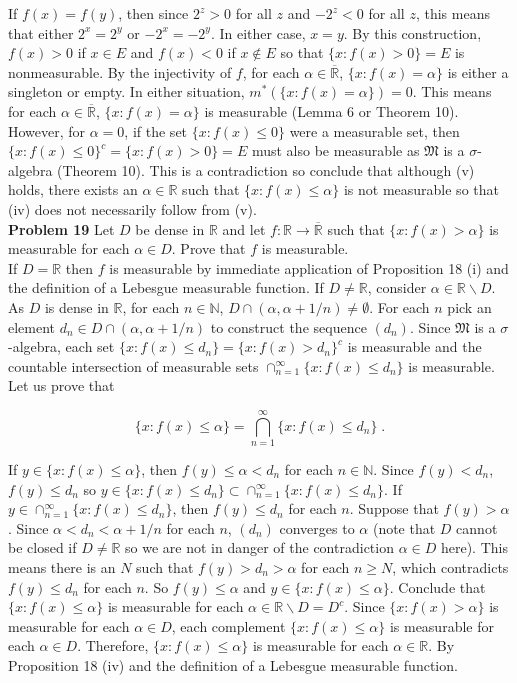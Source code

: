 \documentclass[a4paper]{article}
\begin{document}
If $f(x) = f(y)$, then since $2^z > 0$ for all $z$ and $-2^z < 0$ for all $z$, this means that either $2^x = 2^y$ or $-2^x = -2^y$. In either case, $x = y$. By this construction, $f(x) > 0$ if $x \in E$ and $f(x) < 0$ if $x \not\in E$ so that $\{x : f(x) > 0 \} = E$ is nonmeasurable. By the injectivity of $f$, for each $\alpha \in \overline{\mathbb{R}}$, $\{x : f(x) = \alpha\}$ is either a singleton or empty. In either situation, $m^*(\{x : f(x) = \alpha \}) = 0$. This means for each $\alpha \in \overline{\mathbb{R}}$, $\{x : f(x) = \alpha \}$ is measurable (Lemma 6 or Theorem 10). However, for $\alpha = 0$, if the set $\{x : f(x) \leq 0\}$ were a measurable set, then $\{x : f(x) \leq 0\}^c = \{x : f(x) > 0\} =E$ must also be measurable as $\mathfrak{M}$ is a $\sigma$-algebra (Theorem 10). This is a contradiction so conclude that although (v) holds, there exists an $\alpha \in \mathbb{R}$ such that $\{x : f(x) \leq \alpha\}$ is not measurable so that (iv) does not necessarily follow from (v). \\

{\bf Problem 19} Let $D$ be dense in $\mathbb{R}$ and let $f: \mathbb{R} \rightarrow \overline{\mathbb{R}}$  such that $\{x : f(x) > \alpha\}$ is measurable for each $\alpha \in D$. Prove that $f$ is measurable. \\

If $D = \mathbb{R}$ then $f$ is measurable by immediate application of Proposition 18 (i) and the definition of a Lebesgue measurable function. If $D \neq \mathbb{R}$,  consider $\alpha \in \mathbb{R} \backslash D$. As $D$ is dense in $\mathbb{R}$, for each $n \in \mathbb{N}$, $D \cap (\alpha, \alpha + 1/n) \neq \emptyset$. For each $n$ pick an element $d_n \in D\cap (\alpha, \alpha + 1/n)$ to construct the sequence $(d_n)$. Since $\mathfrak{M}$ is a $\sigma$-algebra, each set $\{x : f(x) \leq d_n\} = \{x : f(x) > d_n\}^c$ is measurable and  the countable intersection of measurable sets $\cap_{n=1}^\infty \{x : f(x) \leq d_n \}$ is measurable. Let us prove that

$$\{x : f(x) \leq \alpha\} = \bigcap_{n=1}^\infty \{x : f(x) \leq d_n \} \;.$$

If $y \in \{x : f(x) \leq \alpha\}$, then $f(y) \leq \alpha< d_n$ for each $n \in \mathbb{N}$. Since $f(y) < d_n$, $f(y) \leq d_n$ so $y \in \{x : f(x) \leq  d_n\}\subset \cap_{n=1}^\infty \{x : f(x) \leq d_n\}$. If $y \in \cap_{n=1}^\infty \{x : f(x) \leq d_n\}$, then $f(y) \leq d_n$ for each $n$. Suppose that $f(y) > \alpha$. Since $\alpha < d_n < \alpha + 1/n$ for each $n$, $(d_n)$ converges to $\alpha$ (note that $D$ cannot be closed if $D \neq \mathbb{R}$ so we are not in danger of the contradiction $\alpha \in D$ here). This means there is an $N$ such that  $f(y) > d_n > \alpha$ for each $n \geq N$, which contradicts $f(y) \leq d_n$ for each $n$. So $f(y) \leq \alpha$ and $y \in \{x: f(x) \leq \alpha\}$. Conclude that $\{x : f(x) \leq \alpha\}$ is measurable for each $\alpha \in \mathbb{R}\backslash D = D^c$.  Since $\{x : f(x) > \alpha\}$ is measurable for each $\alpha \in D$, each complement $\{x : f(x) \leq \alpha\}$ is measurable for each $\alpha \in D$. Therefore, $\{x : f(x) \leq \alpha\}$ is measurable for each $\alpha \in \mathbb{R}$. By Proposition 18 (iv) and the definition of a Lebesgue measurable function. 
\end{document}
